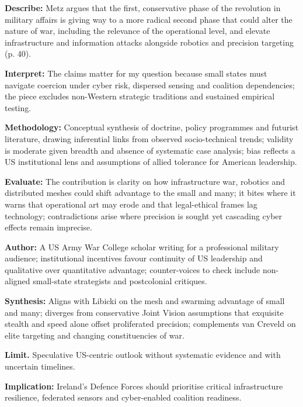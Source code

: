 \textbf{Describe:} Metz argues that the first, conservative phase of the revolution in military affairs is giving way to a more radical second phase that could alter the nature of war, including the relevance of the operational level, and elevate infrastructure and information attacks alongside robotics and precision targeting (p. 40).

\textbf{Interpret:} The claims matter for my question because small states must navigate coercion under cyber risk, dispersed sensing and coalition dependencies; the piece excludes non-Western strategic traditions and sustained empirical testing.

\textbf{Methodology:} Conceptual synthesis of doctrine, policy programmes and futurist literature, drawing inferential links from observed socio-technical trends; validity is moderate given breadth and absence of systematic case analysis; bias reflects a US institutional lens and assumptions of allied tolerance for American leadership.

\textbf{Evaluate:} The contribution is clarity on how infrastructure war, robotics and distributed meshes could shift advantage to the small and many; it bites where it warns that operational art may erode and that legal-ethical frames lag technology; contradictions arise where precision is sought yet cascading cyber effects remain imprecise.

\textbf{Author:} A US Army War College scholar writing for a professional military audience; institutional incentives favour continuity of US leadership and qualitative over quantitative advantage; counter-voices to check include non-aligned small-state strategists and postcolonial critiques.

\textbf{Synthesis:} Aligns with Libicki on the mesh and swarming advantage of small and many; diverges from conservative Joint Vision assumptions that exquisite stealth and speed alone offset proliferated precision; complements van Creveld on elite targeting and changing constituencies of war.

\textbf{Limit.} Speculative US-centric outlook without systematic evidence and with uncertain timelines.

\textbf{Implication:} Ireland’s Defence Forces should prioritise critical infrastructure resilience, federated sensors and cyber-enabled coalition readiness.

